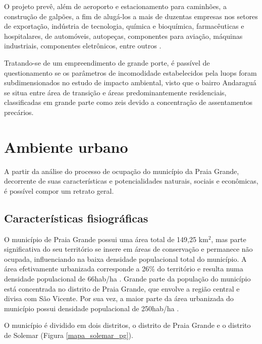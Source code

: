 	O projeto prevê, além de aeroporto e estacionamento para caminhões, a construção de galpões, a fim de alugá-los a mais de duzentas empresas nos setores de exportação, indústria de tecnologia, química e bioquímica, farmacêuticas e hospitalares, de automóveis, autopeças, componentes para aviação, máquinas industriais, componentes eletrônicos, entre outros \cite{Incipar2017a}.
	
	Tratando-se de um empreendimento de grande porte, é passível de questionamento se os parâmetros de incomodidade estabelecidos pela \gls{luops} foram subdimensionados no estudo de impacto ambiental, visto que o bairro Andaraguá se situa entre área de transição e áreas predominantemente residenciais, classificadas em grande parte como \gls{zeis} devido a concentração de assentamentos precários. 

	
	\section{Ambiente urbano}
		
	A partir da análise do processo de ocupação do município da Praia Grande, decorrente de suas características e potencialidades naturais, sociais e econômicas, é possível compor um retrato geral.
	
	\subsection{Características fisiográficas}
	
	O município de Praia Grande possui uma área total de 149,25 km$^2$, mas parte significativa do seu território se insere em áreas de conservação e permanece não ocupada, influenciando na baixa densidade populacional total do município. A área efetivamente urbanizada corresponde a 26\% do território e resulta numa densidade populacional de 66hab/ha \cite{ls2012a}. Grande parte da população do município está concentrada no distrito de Praia Grande, que envolve a região central e divisa com São Vicente. Por sua vez, a maior parte da área urbanizada do município possui densidade populacional de 250hab/ha \cite{ls2012a}.
	
	O município é dividido em dois distritos, o distrito de Praia Grande e o distrito de Solemar (Figura \ref{mapa_solemar_pg}).
	
